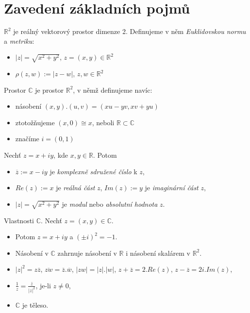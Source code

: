 \section{\texorpdfstring{Zavedení základních pojmů}{Zavedení základních pojmu}}
\vspace{5mm}
\large


\textbf{$\mathbb{R}^2$} je reálný vektorový prostor dimenze 2. Definujeme v něm \emph{Euklidovskou normu} a \emph{metriku}:
\begin{itemize}
    \item $|z| = \sqrt{x^2+y^2}$, $z = (x,y)\in\mathbb{R}^2$
    \item $\rho(z,w):= |z-w|$, $z,w\in\mathbb{R}^2$
\end{itemize}

\begin{definition}
Prostor $\mathbb{C}$ je prostor $\mathbb{R}^2$, v němž definujeme navíc:
\begin{itemize}
    \item násobení $(x,y).(u,v) = (xu-yv, xv+yu)$
    \item ztotožňujeme $(x,0) \cong x$, neboli $\mathbb{R}\subset\mathbb{C}$
    \item značíme $i = (0,1)$
\end{itemize}
\end{definition}

\begin{notation}
Nechť $z = x+iy$, kde $x,y\in\mathbb{R}$. Potom
\begin{itemize}
    \item $\overline{z}:= x-iy$ je \textit{komplexně sdružené číslo} k $z$,
    \item $Re(z):= x$ je \textit{reálná část} $z$, $Im(z):= y$ je \textit{imaginární část} $z$,
    \item $|z| = \sqrt{x^2+y^2}$ je \textit{modul} nebo \textit{absolutní hodnota} $z$.
\end{itemize}
\end{notation} 

\begin{properties}
Vlastnosti $\mathbb{C}$. Nechť $z = (x,y)\in\mathbb{C}$.
\begin{itemize}
    \item Potom $z = x+iy$ a $(\pm i)^2 = -1$.
    \item Násobení v $\mathbb{C}$ zahrnuje násobení v $\mathbb{R}$ i násobení skalárem v $\mathbb{R}^2$.
    \item $|z|^2 = z\overline{z}$, $\overline{zw} = \overline{z}.\overline{w}$, $|zw| = |z|.|w|$, $z+\overline{z} = 2.Re(z)$, $z-\overline{z} = 2i.Im(z)$,
    \item $\frac{1}{z} = \frac{\overline{z}}{|z|^2}$, je-li $z\neq 0$,
    \item $\mathbb{C}$ je těleso.
\end{itemize}
\end{properties}

